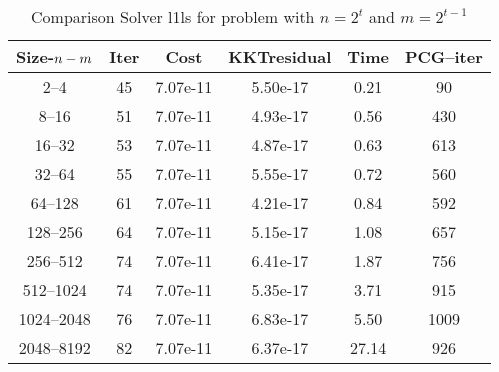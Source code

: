 \documentclass[letterpaper,12pt,oneside,final]{book}
\begin{document}
\begin{table}
\caption{Comparison Solver l1ls  for  problem with $n=2^{t}$ and $m=2^{t-1}$} 
\begin{center}
\begin{tabular}{|*{6}{c}|} \hline
Size-$n\--m$ & \multicolumn{1}{c}{Iter} & \multicolumn{1}{c}{Cost}& \multicolumn{1}{c}{KKTresidual} & \multicolumn{1}{c}{Time} & \multicolumn{1}{c|}{PCG--iter} \\ 
\hline

2--4&45&7.07e-11&5.50e-17&0.21&90 \\
8--16    &51    &7.07e-11    &4.93e-17    &0.56    &430 \\
16--32    &53    &7.07e-11    &4.87e-17    &0.63    &613 \\
32--64    &55    &7.07e-11    &5.55e-17    &0.72    &560 \\
64--128    &61    &7.07e-11    &4.21e-17    &0.84    &592 \\
128--256    &64    &7.07e-11    &5.15e-17    &1.08    &657 \\
256--512    &74    &7.07e-11    &6.41e-17    &1.87    &756 \\
512--1024    &74    &7.07e-11    &5.35e-17    &3.71    &915 \\
1024--2048    &76    &7.07e-11    &6.83e-17    &5.50    &1009 \\
2048--8192    &82    &7.07e-11    &6.37e-17    &27.14    &926 \\
%



\end{tabular}
\end{center}
\end{table}
\end{document}
